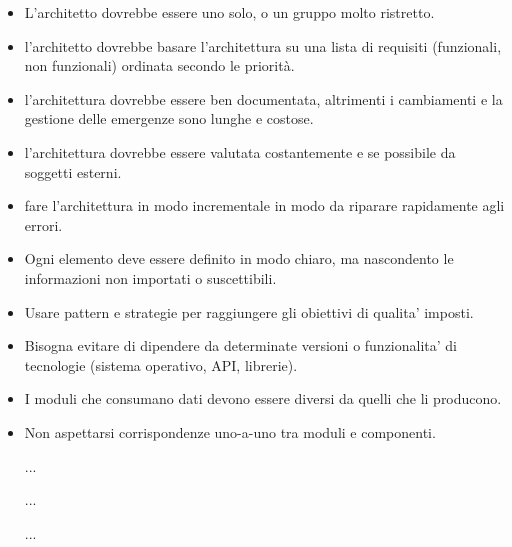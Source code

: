 \begin{itemize}
  \item L'architetto dovrebbe essere uno solo, o un gruppo molto ristretto.
  \item l'architetto dovrebbe basare l'architettura su una lista di requisiti (funzionali, non funzionali) ordinata secondo le priorit\`a.
  \item l'architettura dovrebbe essere ben documentata, altrimenti i cambiamenti e la gestione delle emergenze sono lunghe e costose.
  \item l'architettura dovrebbe essere valutata costantemente e se possibile da soggetti esterni.
  \item fare l'architettura in modo incrementale in modo da riparare rapidamente agli errori.
\end{itemize}

\begin{itemize}
  \item Ogni elemento deve essere definito in modo chiaro, ma nascondento le informazioni non importati o suscettibili.
  \item Usare pattern e strategie per raggiungere gli obiettivi di qualita' imposti.
  \item Bisogna evitare di dipendere da determinate versioni o funzionalita' di tecnologie (sistema operativo, API, librerie).
  \item I moduli che consumano dati devono essere diversi da quelli che li producono.
  \item Non aspettarsi corrispondenze uno-a-uno tra moduli e componenti.
  \item [...]
  \item [...]
  \item [...]
\end{itemize}
